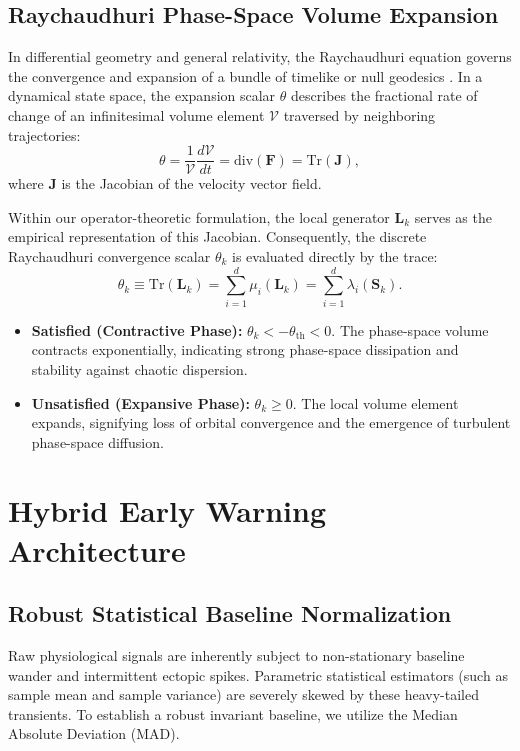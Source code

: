 \documentclass[11pt,a4paper]{article}
\begin{document}
\subsection{Raychaudhuri Phase-Space Volume Expansion}

In differential geometry and general relativity, the Raychaudhuri equation governs the convergence and expansion of a bundle of timelike or null geodesics \cite{Raychaudhuri1955}. In a dynamical state space, the expansion scalar $\theta$ describes the fractional rate of change of an infinitesimal volume element $\mathcal{V}$ traversed by neighboring trajectories:
\begin{equation}
\theta = \frac{1}{\mathcal{V}} \frac{d\mathcal{V}}{dt} = \mathrm{div}(\bm{F}) = \mathrm{Tr}\left( \bm{J} \right),
\end{equation}
where $\bm{J}$ is the Jacobian of the velocity vector field.

Within our operator-theoretic formulation, the local generator $\bm{L}_k$ serves as the empirical representation of this Jacobian. Consequently, the discrete Raychaudhuri convergence scalar $\theta_k$ is evaluated directly by the trace:
\begin{equation}
\theta_k \equiv \mathrm{Tr}(\bm{L}_k) = \sum_{i=1}^d \mu_i(\bm{L}_k) = \sum_{i=1}^d \lambda_i(\bm{S}_k).
\end{equation}
\begin{itemize}
    \item \textbf{Satisfied (Contractive Phase):} $\theta_k < -\theta_{\mathrm{th}} < 0$. The phase-space volume contracts exponentially, indicating strong phase-space dissipation and stability against chaotic dispersion.
    \item \textbf{Unsatisfied (Expansive Phase):} $\theta_k \ge 0$. The local volume element expands, signifying loss of orbital convergence and the emergence of turbulent phase-space diffusion.
\end{itemize}

\section{Hybrid Early Warning Architecture}

\subsection{Robust Statistical Baseline Normalization}

Raw physiological signals are inherently subject to non-stationary baseline wander and intermittent ectopic spikes. Parametric statistical estimators (such as sample mean and sample variance) are severely skewed by these heavy-tailed transients. To establish a robust invariant baseline, we utilize the Median Absolute Deviation (MAD).
\end{document}
